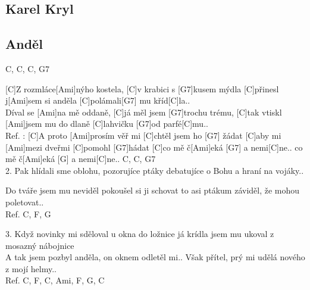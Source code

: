 \documentclass[10pt]{article}
\begin{document}
\begin{Large}
\section{Karel Kryl}

\begin{minipage}{\textwidth}
\subsection{Anděl}
\begin{multicols}{2}
\begin{guitar}
	C, C, C, G7
	
	[C]Z rozmláce[Ami]nýho kostela,
	[C]v krabici s [G7]kusem mýdla
	[C]přinesl j[Ami]sem si anděla
	[C]polámali[G7] mu kříd[C]la..
	\\
	[C]Díval se [Ami]na mě oddaně,
	[C]já měl jsem [G7]trochu trému,
	[C]tak vtiskl [Ami]jsem mu do dlaně
	[C]lahvičku [G7]od parfé[C]mu..
	\\
	Ref. : [C]A proto [Ami]prosím věř mi
	[C]chtěl jsem ho [G7] žádat
	[C]aby mi [Ami]mezi dveřmi
	[C]pomohl [G7]hádat
	[C]co mě č[Ami]eká  [G7] a nemi[C]ne..
	co mě č[Ami]eká [G] a nemi[C]ne..
	C, C, G7
	\\
	2. Pak hlídali sme oblohu,
	pozorujíce ptáky
	debatujíce o Bohu
	a hraní na vojáky..
	
	Do tváře jsem mu neviděl
	pokoušel si ji schovat
	to asi ptákum záviděl,
	že mohou poletovat..
	\\
	Ref. 
	C, F, G
	
	3. Když novinky mi sděloval
	u okna do ložnice
	já krídla jsem mu ukoval
	z mosazný nábojnice
	\\
	A tak jsem pozbyl anděla,
	on oknem odletěl mi..
	Však přítel, prý mi udělá
	nového z mojí helmy..
	\\
	Ref. 
	C, F, C, Ami, F, G, C
\end{guitar}
\end{multicols}
\end{minipage}

\begin{minipage}{\textwidth}

\end{minipage}
\end{Large}
\end{document}
